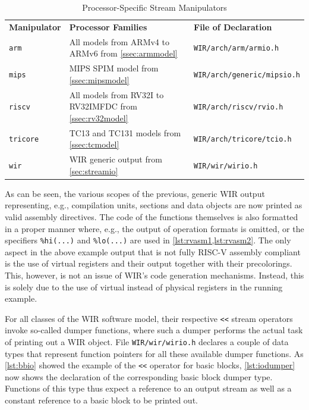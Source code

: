 \begin{table}[t]
  \begin{center}
    \caption{Processor-Specific Stream Manipulators}
    \label{tab:procmanip}
    \begin{tabular}{|l|l|p{5.1cm}|}
      \hline
      \textbf{Manipulator} & \textbf{Processor Families} & \textbf{File of Declaration} \\
      \hhline{|=|=|=|}
      \texttt{arm} & All models from ARMv4 to ARMv6 from \cref{ssec:armmodel} & \texttt{WIR/arch/arm/armio.h} \\
      \hline
      \texttt{mips} & MIPS SPIM model from \cref{ssec:mipsmodel} & \texttt{WIR/arch/generic/mipsio.h} \\
      \hline
      \texttt{riscv} & All models from RV32I to RV32IMFDC from \cref{ssec:rv32model} & \texttt{WIR/arch/riscv/rvio.h} \\
      \hline
      \texttt{tricore} & TC13 and TC131 models from \cref{ssec:tcmodel} & \texttt{WIR/arch/tricore/tcio.h} \\
      \hline
      \texttt{wir} & \gls{WIR} generic output from \cref{sec:streamio} & \texttt{WIR/wir/wirio.h} \\
      \hline
    \end{tabular}
  \end{center}
\end{table}

As can be seen, the various scopes of the previous, generic \gls{WIR} output representing, e.g., compilation units, sections and data objects are now printed as valid assembly directives.
The code of the functions themselves is also formatted in a proper manner where, e.g., the output of operation formats is omitted, or the specifiers \texttt{\%hi(...)} and \texttt{\%lo(...)} are used in \cref{lst:rvasm1,lst:rvasm2}.
The only aspect in the above example output that is not fully RISC-V assembly compliant is the use of virtual registers and their output together with their precolorings.
This, however, is not an issue of \gls{WIR}'s code generation mechanisms.
Instead, this is solely due to the use of virtual instead of physical registers in the running example.

For all classes of the \gls{WIR} software model, their respective \texttt{<{}<} stream operators invoke so-called dumper functions, where such a dumper performs the actual task of printing out a \gls{WIR} object.
File \texttt{WIR/wir/wirio.h} declares a couple of data types that represent function pointers for all these available dumper functions.
As \cref{lst:bbio} showed the example of the \texttt{<{}<} operator for basic blocks, \cref{lst:iodumper} now shows the declaration of the corresponding basic block dumper type.
Functions of this type thus expect a reference to an output stream as well as a constant reference to a basic block to be printed out.


